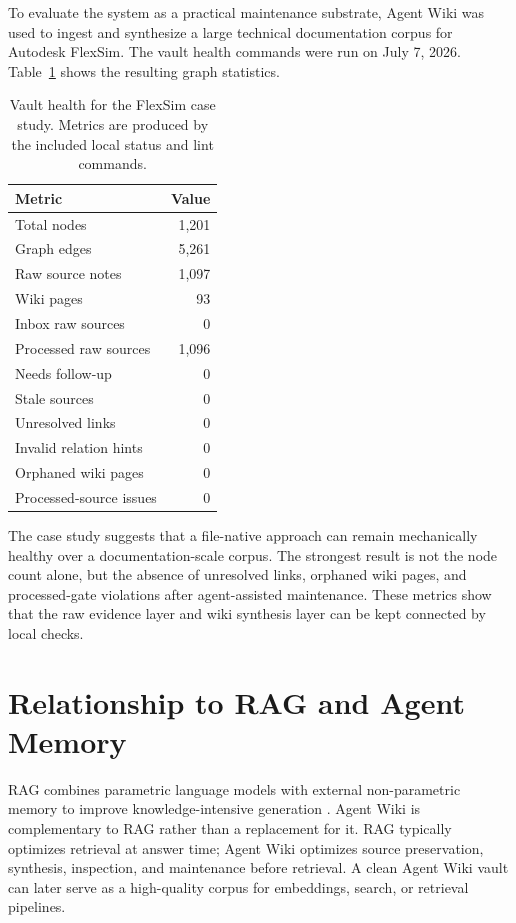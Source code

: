 \documentclass[10pt]{article}
\begin{document}
To evaluate the system as a practical maintenance substrate, Agent Wiki was used
to ingest and synthesize a large technical documentation corpus for Autodesk
FlexSim. The vault health commands were run on July 7, 2026. Table~\ref{tab:case}
shows the resulting graph statistics.

\begin{table}[h]
\centering
\begin{tabular}{lr}
\toprule
Metric & Value \\
\midrule
Total nodes & 1,201 \\
Graph edges & 5,261 \\
Raw source notes & 1,097 \\
Wiki pages & 93 \\
Inbox raw sources & 0 \\
Processed raw sources & 1,096 \\
Needs follow-up & 0 \\
Stale sources & 0 \\
Unresolved links & 0 \\
Invalid relation hints & 0 \\
Orphaned wiki pages & 0 \\
Processed-source issues & 0 \\
\bottomrule
\end{tabular}
\caption{Vault health for the FlexSim case study. Metrics are produced by the
included local status and lint commands.}
\label{tab:case}
\end{table}

The case study suggests that a file-native approach can remain mechanically
healthy over a documentation-scale corpus. The strongest result is not the node
count alone, but the absence of unresolved links, orphaned wiki pages, and
processed-gate violations after agent-assisted maintenance. These metrics show
that the raw evidence layer and wiki synthesis layer can be kept connected by
local checks.

\section{Relationship to RAG and Agent Memory}

RAG combines parametric language models with external non-parametric memory to
improve knowledge-intensive generation \cite{lewis2020rag}. Agent Wiki is
complementary to RAG rather than a replacement for it. RAG typically optimizes
retrieval at answer time; Agent Wiki optimizes source preservation, synthesis,
inspection, and maintenance before retrieval. A clean Agent Wiki vault can later
serve as a high-quality corpus for embeddings, search, or retrieval pipelines.
\end{document}
